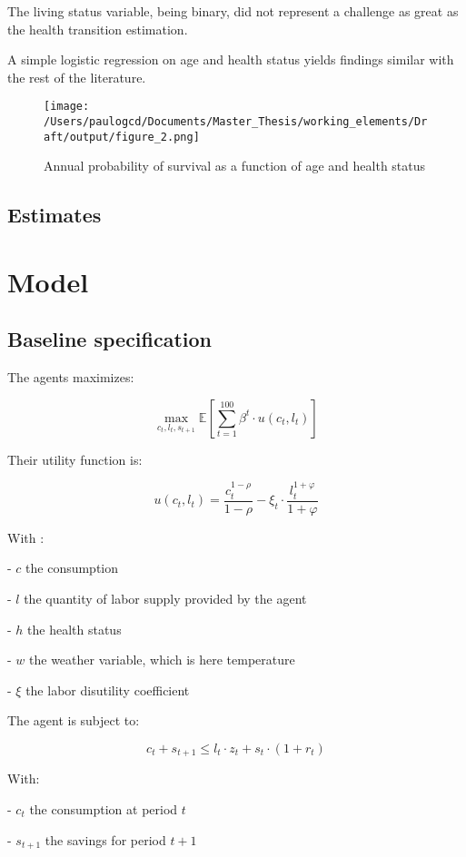 \documentclass{article}
\begin{document}
The living status variable, being binary, did not represent a challenge
as great as the health transition estimation. 

A simple logistic regression on age and health status yields findings similar with the
rest of the literature. 

\begin{figure}[ht]
    \texttt{[image: /Users/paulogcd/Documents/Master\_Thesis/working\_elements/Draft/output/figure\_2.png]}
    \caption{Annual probability of survival as a function of age and health status}
\end{figure}


\subsection{Estimates}

\section{Model}

\subsection{Baseline specification }

The agents maximizes: 

$$ \max_{c_{t},l_{t},s_{t+1}}{\mathbb{E}\left[\sum_{t=1}^{100} \beta^{t}\cdot u(c_t,l_t)\right]}$$

Their utility function is: 

$$u(c_{t},l_{t}) = \frac{c_{t}^{1-\rho}}{1-\rho}-\xi_{t}\cdot \frac{l_{t}^{1+\varphi}}{1+\varphi}$$

With : 

-  $c$  the consumption

-  $l$  the quantity of labor supply provided by the agent

-  $h$  the health status

-  $w$  the weather variable, which is here temperature

-  $\xi$ the labor disutility coefficient

The agent is subject to: 

$$c_{t} + s_{t+1} \leq l_{t}\cdot z_{t} + s_{t}\cdot(1+r_{t})$$

With: 

-  $c_t$ the consumption at period $t$

-  $s_{t+1}$ the savings for period $t+1$
\end{document}
